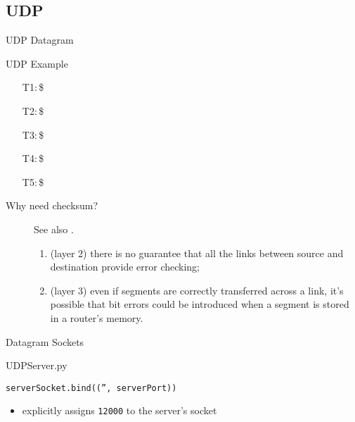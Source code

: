 \subsection{UDP}

\begin{frame}{UDP Datagram}
  \begin{center}
  \end{center}
  \label{fig:udp-datagram-format}
\end{frame}

\begin{frame}{UDP Example}
  \begin{itemize}
  \item[T1:\,\$] 
  \item[T2:\,\$] 
  \item[T3:\,\$] 
  \item[T4:\,\$] 
  \item[T5:\,\$] 
  \end{itemize}
\end{frame}

\begin{description}
\item[Why need checksum?]  See also .
  \begin{enumerate}
  \item (layer 2) there is no guarantee that all the links between source and destination
    provide error checking;
  \item (layer 3) even if segments are correctly transferred across a link, it's possible
    that bit errors could be introduced when a segment is stored in a router's memory.
  \end{enumerate}
\end{description}

\begin{frame}{Datagram Sockets}
  \centering%
  \mode<beamer>{ \texttt{[image: socket-datagram]} }%
\end{frame}

\begin{frame}{UDPServer.py}
  \begin{center}
  \end{center}
  \begin{iblock}{\texttt{serverSocket.bind(('', serverPort))}}
    \begin{itemize}
    \item explicitly assigns \texttt{12000} to the server's socket
    \end{itemize}
  \end{iblock}
\end{frame}

